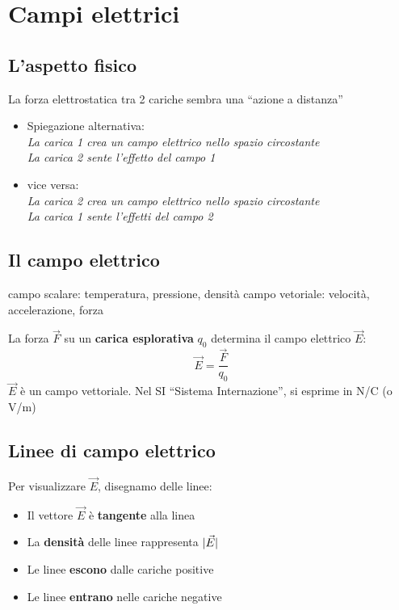 \chapter{Campi elettrici}
\section {L'aspetto fisico}
La forza elettrostatica tra 2 cariche sembra una ``azione a distanza''
\begin{itemize}
\item Spiegazione alternativa:\\
  \textit{La carica 1 crea un campo elettrico nello spazio circostante}\\
  \textit{La carica 2 sente l'effetto del campo 1}\\
\item vice versa:\\
  \textit{La carica 2 crea un campo elettrico nello spazio circostante}\\
  \textit{La carica 1 sente l'effetti del campo 2}
\end{itemize}
\section {Il campo elettrico}
\begin{tasks}{2}
\task campo scalare: temperatura, pressione, densità
\task campo vetoriale: velocità, accelerazione, forza
\end{tasks}
La forza $\vec{F}$ su un \textbf{carica esplorativa} $q_0$ determina il campo elettrico $\vec{E}$:
\begin{equation}
  \vec{E}=\frac{\vec{F}}{q_0}
\end{equation}
$\vec{E}$ è un campo vettoriale. Nel SI ``Sistema Internazione'', si esprime in N/C (o V/m)
\section{Linee di campo elettrico}
Per visualizzare $\vec{E}$, disegnamo delle linee:
\begin{itemize}
	\item Il vettore $\vec{E}$ è \textbf{tangente} alla linea 
	\item La \textbf{densità} delle linee rappresenta $\lvert\vec{E}\rvert$
        \item Le linee \textbf{escono} dalle cariche positive
        \item Le linee \textbf{entrano} nelle cariche negative
\end {itemize}
